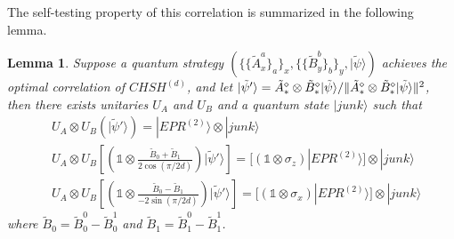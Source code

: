 \documentclass[11pt,letterpaper]{article}
\newcommand{\ket}[1]{|#1\rangle}
\newcommand{\x}{\otimes}
\DeclarePairedDelimiter{\norm}{\lVert}{\rVert}
\newcommand{\1}{\mathbb{1}}
\newcommand{\CHSH}{CHSH^{(d)}}
\newcommand{\EPR}[1]{EPR^{(#1)}}
\newcommand{\paulix}{\sigma_x}
\newcommand{\pauliz}{\sigma_z}
\newcommand{\tA}{\tilde{A}}
\newcommand{\tB}{\tilde{B}}
\newcommand{\tpsi}{\tilde{\psi}}
\newtheorem{lemma}[theorem]{Lemma}
\theoremstyle{definition}
\begin{document}
The self-testing property of this correlation is summarized in the following lemma.
\begin{lemma}
	\label{lm:chsh_comp}
	Suppose a quantum strategy $\left(\{\{\tA_x^a\}_a\}_x, \{\{\tB_y^b\}_b\}_y, \ket{\tpsi}\right)$
	achieves the optimal correlation of $\CHSH$, 
	and let $\ket{\tpsi'} = \tA_\ast^\diamond \x \tB_\ast^\diamond \ket{\tpsi}/\norm{\tA_\ast^\diamond \x \tB_\ast^\diamond \ket{\tpsi}}^2$,
	then there exists unitaries $U_A$ and $U_B$ 
	and a quantum state $\ket{junk}$
	such that 
	\begin{align*}
		&U_A\x U_B \left( \ket{\tpsi'}\right) = \ket{\EPR{2}}\x \ket{junk} \\
		&U_A\x U_B \left[\left(\1 \x  \frac{\tB_0 + \tB_1}{2\cos(\pi/2d)}\right)\ket{\tpsi'}\right]
		=[(\1 \x \pauliz) \ket{\EPR{2}}] \x \ket{junk} \\
		&U_A\x U_B \left[\left(\1 \x  \frac{\tB_0 - \tB_1}{-2\sin(\pi/2d)}\right)\ket{\tpsi'} \right]
		=[(\1 \x \paulix) \ket{\EPR{2}}] \x \ket{junk} 
	\end{align*}
	where $\tB_0 = \tB_0^0 - \tB_0^1$ and $\tB_1 = \tB_1^0 - \tB_1^1$.
\end{lemma}
\end{document}
